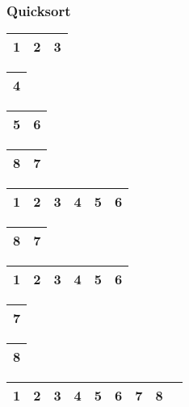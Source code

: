 \begin{frame}
\frametitle{Quicksort}
\begin{table}
\begin{tabular}{| c | c | c |}
\hline
\cellcolor{blue!25}1 & \cellcolor{blue!25}2 & \cellcolor{blue!25}3\\ 
\hline
\end{tabular}
\quad
\begin{tabular}{| c |}
\hline
4 \\ 
\hline
\end{tabular}
\quad
\begin{tabular}{| c | c |}
\hline
\cellcolor{blue!25}5 & \cellcolor{blue!25}6\\ 
\hline
\end{tabular}
\quad
\begin{tabular}{| c | c |}
\hline
8 & 7 \\ 
\hline
\end{tabular}
\end{table}

\begin{table}
\begin{tabular}{| c | c | c | c | c | c |}
\hline
\cellcolor{blue!25}1 & \cellcolor{blue!25}2 & \cellcolor{blue!25}3 & \cellcolor{blue!25}4 & \cellcolor{blue!25}5 & \cellcolor{blue!25}6\\ 
\hline
\end{tabular}
\quad
\begin{tabular}{| c | c |}
\hline
\cellcolor{red!25}8 & 7 \\ 
\hline
\end{tabular}
\end{table}

\begin{table}
\begin{tabular}{| c | c | c | c | c | c |}
\hline
\cellcolor{blue!25}1 & \cellcolor{blue!25}2 & \cellcolor{blue!25}3 & \cellcolor{blue!25}4 & \cellcolor{blue!25}5 & \cellcolor{blue!25}6\\ 
\hline
\end{tabular}
\quad
\begin{tabular}{| c |}
\hline
7 \\ 
\hline
\end{tabular}
\quad
\begin{tabular}{| c |}
\hline
\cellcolor{blue!25}8 \\ 
\hline
\end{tabular}
\end{table}

\begin{table}
\begin{tabular}{| c | c | c | c | c | c | cc | c |}
\hline
\cellcolor{blue!25}1 & \cellcolor{blue!25}2 & \cellcolor{blue!25}3 & \cellcolor{blue!25}4 & \cellcolor{blue!25}5 & \cellcolor{blue!25}6 & \cellcolor{blue!25}7 & \cellcolor{blue!25}8\\ 
\hline
\end{tabular}
\end{table}
\end{frame}

